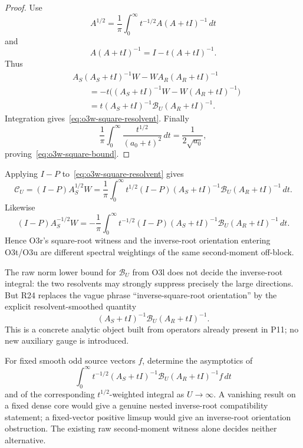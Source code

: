 \begin{proof}
Use
\[
 A^{1/2}
 =\frac1\pi\int_0^\infty
 t^{-1/2}A(A+tI)^{-1}\,dt
\]
and
\[
 A(A+tI)^{-1}=I-t(A+tI)^{-1}.
\]
Thus
\[
\begin{aligned}
 &A_S(A_S+tI)^{-1}W
 -WA_R(A_R+tI)^{-1}\\
 &\qquad
 =-t\bigl((A_S+tI)^{-1}W-W(A_R+tI)^{-1}\bigr)\\
 &\qquad
 =t(A_S+tI)^{-1}\mathscr B_U(A_R+tI)^{-1}.
\end{aligned}
\]
Integration gives~\eqref{eq:o3w-square-resolvent}.  Finally
\[
 \frac1\pi\int_0^\infty
 \frac{t^{1/2}}{(a_0+t)^2}\,dt
 =\frac1{2\sqrt{a_0}},
\]
proving~\eqref{eq:o3w-square-bound}.
\end{proof}

\begin{corollary}
\label{cor:o3w-common-source}
Applying $I-P$ to~\eqref{eq:o3w-square-resolvent} gives
\[
 \boxed{
 \mathscr C_U
 =(I-P)A_S^{1/2}W
 =\frac1\pi\int_0^\infty t^{1/2}
 (I-P)(A_S+tI)^{-1}\mathscr B_U(A_R+tI)^{-1}\,dt.
 }
\tag{O3W.9}\label{eq:o3w-C-resolvent}
\]
Likewise
\[
 \boxed{
 (I-P)A_S^{-1/2}W
 =-\frac1\pi\int_0^\infty t^{-1/2}
 (I-P)(A_S+tI)^{-1}\mathscr B_U(A_R+tI)^{-1}\,dt.
 }
\tag{O3W.10}\label{eq:o3w-inverse-offblock}
\]
Hence O3r's square-root witness and the inverse-root orientation entering O3t/O3u are
different spectral weightings of the same second-moment off-block.
\end{corollary}

\begin{remark}[R24 reduction]
\label{rem:o3w-reduction}
The raw norm lower bound for $\mathscr B_U$ from O3l does not decide the inverse-root
integral: the two resolvents may strongly suppress precisely the large directions.  But
R24 replaces the vague phrase ``inverse-square-root orientation'' by the explicit
resolvent-smoothed quantity
\[
 (A_S+tI)^{-1}\mathscr B_U(A_R+tI)^{-1}.
\]
This is a concrete analytic object built from operators already present in P11; no new
auxiliary gauge is introduced.
\end{remark}

\begin{openproblem}
\label{open:o3w-resolvent-offblock}
For fixed smooth odd source vectors $f$, determine the asymptotics of
\[
 \int_0^\infty t^{-1/2}
 (A_S+tI)^{-1}\mathscr B_U(A_R+tI)^{-1}f\,dt
\]
and of the corresponding $t^{1/2}$-weighted integral as $U\to\infty$.
A vanishing result on a fixed dense core would give a genuine nested inverse-root
compatibility statement; a fixed-vector positive limsup would give an inverse-root
orientation obstruction.  The existing raw second-moment witness alone decides neither
alternative.
\end{openproblem}
